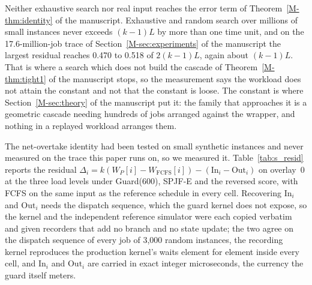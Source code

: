 \documentclass[mathematics,supfile,submit,moreauthors]{Definitions/mdpi}
\newcommand{\devnum}[1]{#1}
\begin{document}
Neither exhaustive search nor real input reaches the error term of
Theorem~\ref*{M-thm:identity} of the manuscript. Exhaustive and random search over millions of small
instances never exceeds $(k-1)L$ by more than one time unit, and on the
\devnum{17.6}-million-job trace of Section~\ref*{M-sec:experiments} of the manuscript the largest residual
reaches \devnum{0.470} to \devnum{0.518} of $2(k-1)L$, again about $(k-1)L$. That is
where a search which does not build the cascade of Theorem~\ref*{M-thm:tight1} of the manuscript stops,
so the measurement says the workload does not attain the constant and not that the
constant is loose. The constant is where Section~\ref*{M-sec:theory} of the manuscript put it: the
family that approaches it is a geometric cascade needing hundreds of jobs arranged
against the wrapper, and nothing in a replayed workload arranges them.

The net-overtake identity had been tested on small synthetic instances and never measured on
the trace this paper runs on, so we measured it. Table~\ref{tab:s_resid} reports the residual
$\Delta_i = k(W_P[i] - W_{\mathrm{FCFS}}[i]) - (\mathrm{In}_i - \mathrm{Out}_i)$ on overlay~0
at the three load levels under Guard($\devnum{600}$), SPJF-E and the reversed score,
with FCFS on the same input as the reference schedule in every cell. Recovering $\mathrm{In}_i$ and
$\mathrm{Out}_i$ needs the dispatch sequence, which the guard kernel does not expose, so the
kernel and the independent reference simulator were each copied verbatim and given recorders
that add no branch and no state update; the two agree on the dispatch sequence of every job of
\devnum{3{,}000} random instances, the recording kernel reproduces the production kernel's
waits element for element inside every cell, and $\mathrm{In}_i$ and $\mathrm{Out}_i$ are
carried in exact integer microseconds, the currency the guard itself meters.
\end{document}
